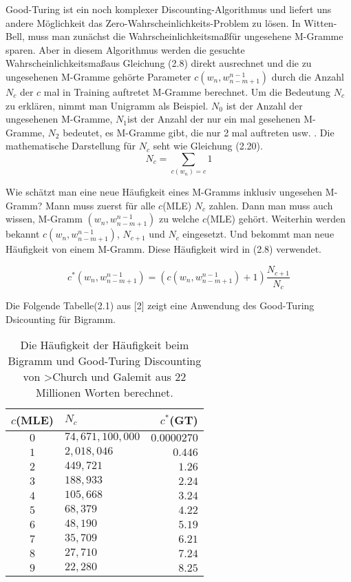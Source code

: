 Good-Turing ist ein noch komplexer Discounting-Algorithmus und liefert uns andere M\"oglichkeit  das Zero-Wahrscheinlichkeits-Problem zu l\"osen. In Witten-Bell, muss man zun\"achst die Wahrscheinlichkeitsma\ss f\"ur ungesehene M-Gramme sparen. Aber in diesem Algorithmus werden die gesuchte Wahrscheinlichkeitsma\ss aus Gleichung (2.8) direkt ausrechnet und die zu ungesehenen M-Gramme geh\"orte Parameter $c(w_{n},w_{n-m+1}^{n-1})$ durch die Anzahl $N_{c}$ der  $c$ mal in Training auftretet M-Gramme berechnet. Um die Bedeutung $N_{c}$ zu erkl\"aren, nimmt man Unigramm als Beispiel. $N_{0}$ ist der Anzahl der ungesehenen M-Gramme, $N_{1}$ist der Anzahl der nur ein mal gesehenen M-Gramme, $N_{2}$ bedeutet, es   M-Gramme gibt, die nur 2 mal auftreten usw. . Die mathematische Darstellung f\"ur $N_{c}$ seht wie Gleichung (2.20).
\begin{equation}
N_{c}=\sum_{c(w_{n})=c}1
\end{equation}

Wie sch\"atzt man eine neue H\"aufigkeit eines M-Gramms inklusiv ungesehen M-Gramm? Mann muss zuerst f\"ur alle $c$(MLE) $N_{c}$ zahlen. Dann man muss auch wissen, M-Gramm $(w_{n},w_{n-m+1}^{n-1})$ zu welche $c$(MLE) geh\"ort. Weiterhin werden bekannt $c(w_{n},w_{n-m+1}^{n-1})$, $N_{c+1}$ und $N_{c}$ eingesetzt. Und bekommt man neue H\"aufigkeit von einem M-Gramm. Diese H\"aufigkeit wird in (2.8) verwendet.

\begin{equation}
c^{*}(w_{n},w_{n-m+1}^{n-1})=(c(w_{n},w_{n-m+1}^{n-1})+1)\frac{N_{c+1}}{N_{c}}
\end{equation}

Die Folgende Tabelle(2.1)  aus [2] zeigt eine Anwendung des Good-Turing Dsicounting f\"ur Bigramm.

\begin{table}[h]
  \begin{center}
    \begin{tabular}{clr}
      \toprule
      \bf $c$(MLE) & \bf $N_{c}$ & \bf $c^{*}$(GT)\\      
      \midrule
      $0$ &  $74,671,100,000$ & $0.0000270$  \\
      $1$ &  $2,018,046$ 			& $0.446$  \\
      $2$ &  $449,721$ 				& $1.26$  \\
      $3$ &  $188,933$ 				& $2.24$  \\
      $4$ &  $105,668$ 				& $3.24$  \\
      $5$ &  $68,379$ 				& $4.22$  \\
      $6$ &  $48,190$ 				& $5.19$  \\
      $7$ &  $35,709$ 				& $6.21$  \\
      $8$ &  $27,710$ 				& $7.24$  \\
      $9$ &  $22,280$ 				& $8.25$  \\
      \bottomrule
    \end{tabular}
  \end{center}
\caption{Die H\"aufigkeit der H\"aufigkeit beim Bigramm und Good-Turing Discounting von >Church und Galemit aus 22 Millionen Worten berechnet.}
\label{tab:table_1}
\end{table}


